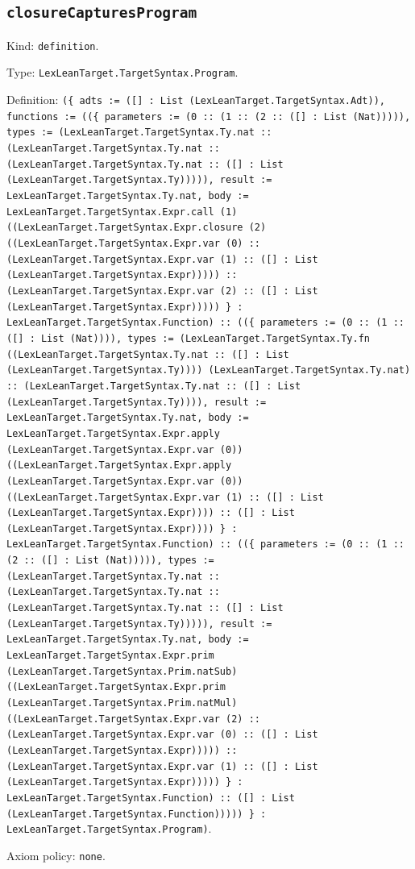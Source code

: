 \documentclass[11pt]{article}
\begin{document}
\subsection*{\texttt{closureCapturesProgram}}
\noindent Kind: \texttt{definition}.\par
\noindent Type: \texttt{LexLeanTarget.TargetSyntax.Program}.\par
\noindent Definition: \texttt{(\{ adts := ([] : List (LexLeanTarget.TargetSyntax.Adt)), functions := ((\{ parameters := (0 :: (1 :: (2 :: ([] : List (Nat))))), types := (LexLeanTarget.TargetSyntax.Ty.nat :: (LexLeanTarget.TargetSyntax.Ty.nat :: (LexLeanTarget.TargetSyntax.Ty.nat :: ([] : List (LexLeanTarget.TargetSyntax.Ty))))), result := LexLeanTarget.TargetSyntax.Ty.nat, body := LexLeanTarget.TargetSyntax.Expr.call (1) ((LexLeanTarget.TargetSyntax.Expr.closure (2) ((LexLeanTarget.TargetSyntax.Expr.var (0) :: (LexLeanTarget.TargetSyntax.Expr.var (1) :: ([] : List (LexLeanTarget.TargetSyntax.Expr))))) :: (LexLeanTarget.TargetSyntax.Expr.var (2) :: ([] : List (LexLeanTarget.TargetSyntax.Expr))))) \} : LexLeanTarget.TargetSyntax.Function) :: ((\{ parameters := (0 :: (1 :: ([] : List (Nat)))), types := (LexLeanTarget.TargetSyntax.Ty.fn ((LexLeanTarget.TargetSyntax.Ty.nat :: ([] : List (LexLeanTarget.TargetSyntax.Ty)))) (LexLeanTarget.TargetSyntax.Ty.nat) :: (LexLeanTarget.TargetSyntax.Ty.nat :: ([] : List (LexLeanTarget.TargetSyntax.Ty)))), result := LexLeanTarget.TargetSyntax.Ty.nat, body := LexLeanTarget.TargetSyntax.Expr.apply (LexLeanTarget.TargetSyntax.Expr.var (0)) ((LexLeanTarget.TargetSyntax.Expr.apply (LexLeanTarget.TargetSyntax.Expr.var (0)) ((LexLeanTarget.TargetSyntax.Expr.var (1) :: ([] : List (LexLeanTarget.TargetSyntax.Expr)))) :: ([] : List (LexLeanTarget.TargetSyntax.Expr)))) \} : LexLeanTarget.TargetSyntax.Function) :: ((\{ parameters := (0 :: (1 :: (2 :: ([] : List (Nat))))), types := (LexLeanTarget.TargetSyntax.Ty.nat :: (LexLeanTarget.TargetSyntax.Ty.nat :: (LexLeanTarget.TargetSyntax.Ty.nat :: ([] : List (LexLeanTarget.TargetSyntax.Ty))))), result := LexLeanTarget.TargetSyntax.Ty.nat, body := LexLeanTarget.TargetSyntax.Expr.prim (LexLeanTarget.TargetSyntax.Prim.natSub) ((LexLeanTarget.TargetSyntax.Expr.prim (LexLeanTarget.TargetSyntax.Prim.natMul) ((LexLeanTarget.TargetSyntax.Expr.var (2) :: (LexLeanTarget.TargetSyntax.Expr.var (0) :: ([] : List (LexLeanTarget.TargetSyntax.Expr))))) :: (LexLeanTarget.TargetSyntax.Expr.var (1) :: ([] : List (LexLeanTarget.TargetSyntax.Expr))))) \} : LexLeanTarget.TargetSyntax.Function) :: ([] : List (LexLeanTarget.TargetSyntax.Function))))) \} : LexLeanTarget.TargetSyntax.Program)}.\par
\noindent Axiom policy: \texttt{none}.\par
\end{document}

